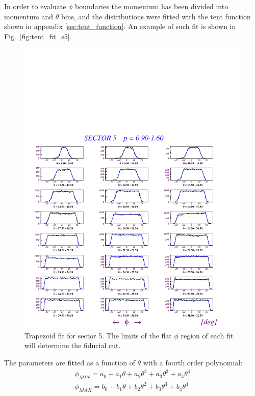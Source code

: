 In order to evaluate $\phi$ boundaries the momentum has been divided into momentum and $\theta$ bins,
and the distributions were fitted with the tent function shown in appendix \ref{sec:tent_function}.
An example of such fit is shown in Fig.~\ref{fig:tent_fit_s5}.

\begin{figure}[tbp]
 \begin{center}
 \includegraphics[width = 16cm, bb=0 0 560 560]{img/traped_fit_s5}
  \caption[Trapezoid fit for sector 5]
          { Trapezoid fit for sector 5. The limits of the flat $\phi$ region of each fit
                     will determine the fiducial cut.}
 \label{fig:traped_fit_s5}
 \end{center}
\end{figure}

The parameters are fitted as a function
of $\theta$ with a fourth order polynomial:
$$
\begin{array}{c}
 \phi_{MIN} = a_0 + a_1\theta + a_2\theta^2 + a_3\theta^3 + a_4\theta^4 \\
 \phi_{MAX} = b_0 + b_1\theta + b_2\theta^2 + b_3\theta^3 + b_4\theta^4 \\
\end{array}
$$

